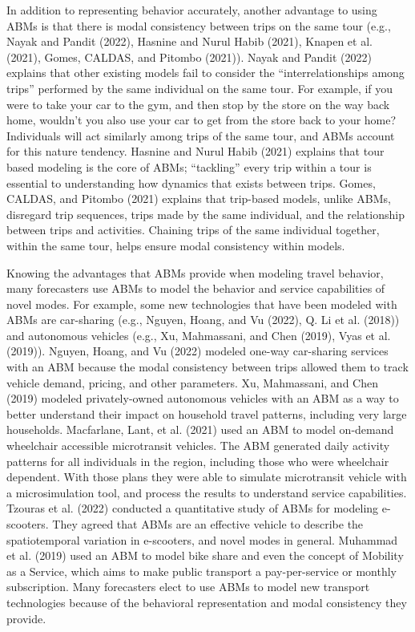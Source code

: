 \documentclass[12pt, oneside, openright]{byuthesis}
\begin{document}
In addition to representing behavior accurately, another advantage to using ABMs is that there is modal consistency between trips on the same tour (e.g., Nayak and Pandit (2022), Hasnine and Nurul Habib (2021), Knapen et al. (2021), Gomes, CALDAS, and Pitombo (2021)). Nayak and Pandit (2022) explains that other existing models fail to consider the ``interrelationships among trips'' performed by the same individual on the same tour. For example, if you were to take your car to the gym, and then stop by the store on the way back home, wouldn't you also use your car to get from the store back to your home? Individuals will act similarly among trips of the same tour, and ABMs account for this nature tendency. Hasnine and Nurul Habib (2021) explains that tour based modeling is the core of ABMs; ``tackling'' every trip within a tour is essential to understanding how dynamics that exists between trips. Gomes, CALDAS, and Pitombo (2021) explains that trip-based models, unlike ABMs, disregard trip sequences, trips made by the same individual, and the relationship between trips and activities. Chaining trips of the same individual together, within the same tour, helps ensure modal consistency within models.

Knowing the advantages that ABMs provide when modeling travel behavior, many forecasters use ABMs to model the behavior and service capabilities of novel modes. For example, some new technologies that have been modeled with ABMs are car-sharing (e.g., Nguyen, Hoang, and Vu (2022), Q. Li et al. (2018)) and autonomous vehicles (e.g., Xu, Mahmassani, and Chen (2019), Vyas et al. (2019)). Nguyen, Hoang, and Vu (2022) modeled one-way car-sharing services with an ABM because the modal consistency between trips allowed them to track vehicle demand, pricing, and other parameters. Xu, Mahmassani, and Chen (2019) modeled privately-owned autonomous vehicles with an ABM as a way to better understand their impact on household travel patterns, including very large households. Macfarlane, Lant, et al. (2021) used an ABM to model on-demand wheelchair accessible microtransit vehicles. The ABM generated daily activity patterns for all individuals in the region, including those who were wheelchair dependent. With those plans they were able to simulate microtransit vehicle with a microsimulation tool, and process the results to understand service capabilities. Tzouras et al. (2022) conducted a quantitative study of ABMs for modeling e-scooters. They agreed that ABMs are an effective vehicle to describe the spatiotemporal variation in e-scooters, and novel modes in general. Muhammad et al. (2019) used an ABM to model bike share and even the concept of Mobility as a Service, which aims to make public transport a pay-per-service or monthly subscription. Many forecasters elect to use ABMs to model new transport technologies because of the behavioral representation and modal consistency they provide.
\end{document}
